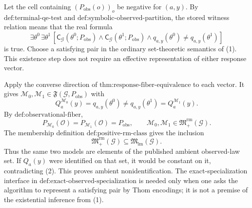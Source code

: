 Let the cell containing \((P_{\mathrm{obs}}(o))_o\) be negative for \((a,y)\). By \(\text{def:terminal-qe-test}\) and \(\text{def:symbolic-observed-partition}\), the stored witness relation means that the real formula
\[
\exists\theta^0\,\exists\theta^1\,
\left[
\mathsf C_{\mathcal G}(\theta^0;P_{\mathrm{obs}})
\wedge\mathsf C_{\mathcal G}(\theta^1;P_{\mathrm{obs}})
\wedge q_{a,y}(\theta^0)\neq q_{a,y}(\theta^1)
\right]
\tag{1}
\]
is true. Choose a satisfying pair in the ordinary set-theoretic semantics of (1). This existence step does not require an effective representation of either response vector.

Apply the converse direction of \(\text{thm:response-fiber-equivalence}\) to each vector. It gives \(\mathcal M_0,\mathcal M_1\in\mathfrak F(\mathcal G,P_{\mathrm{obs}})\) with
\[
Q_a^{\mathcal M_0}(y)=q_{a,y}(\theta^0)
\neq q_{a,y}(\theta^1)=Q_a^{\mathcal M_1}(y).
\tag{2}
\]
By \(\text{def:observational-fiber}\),
\[
P_{\mathcal M_0}(\mathcal O)
=P_{\mathcal M_1}(\mathcal O)
=P_{\mathrm{obs}},
\qquad
\mathcal M_0,\mathcal M_1\in\mathfrak M_{+}^{\mathrm{rm}}(\mathcal G).
\tag{3}
\]
The membership definition \(\text{def:positive-rm-class}\) gives the inclusion
\[
\mathfrak M_{+}^{\mathrm{rm}}(\mathcal G)
\subseteq\mathfrak M_{\mathrm{lm}}(\mathcal G).
\tag{4}
\]
Thus the same two models are elements of the published ambient observed-law set. If \(Q_a(y)\) were identified on that set, it would be constant on it, contradicting (2). This proves ambient nonidentification. The exact-specialization interface in \(\text{def:exact-observed-specialization}\) is needed only when one asks the algorithm to represent a satisfying pair by Thom encodings; it is not a premise of the existential inference from (1).